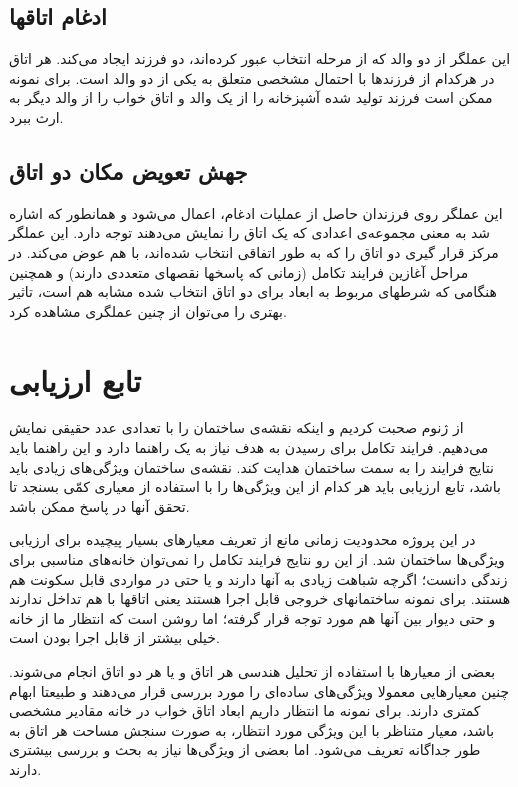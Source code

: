 \documentclass{report}
\begin{document}
\subsection{ادغام اتاقها}
این عملگر از دو والد که از مرحله انتخاب عبور کرده‌اند، دو فرزند ایجاد می‌کند. هر اتاق در هرکدام از فرزندها با احتمال مشخصی متعلق به یکی از دو والد است. برای نمونه ممکن است فرزند تولید شده آشپزخانه را از یک والد و اتاق خواب را از والد دیگر به ارث ببرد.

\subsection{جهش تعویض مکان دو اتاق}
این عملگر روی فرزندان حاصل از عملیات ادغام، اعمال می‌شود و همانطور که اشاره شد به معنی مجموعه‌ی اعدادی که یک اتاق را نمایش می‌دهند توجه دارد. این عملگر مرکز قرار گیری دو اتاق را که به طور اتفاقی انتخاب شده‌اند، با هم عوض می‌کند. در مراحل آغازین فرایند تکامل (زمانی که پاسخها نقصهای متعددی دارند) و همچنین هنگامی که شرطهای مربوط به ابعاد برای دو اتاق انتخاب شده مشابه هم است، تاثیر بهتری را می‌توان از چنین عملگری مشاهده کرد. 

\section{تابع ارزیابی}
از ژنوم صحبت کردیم و اینکه نقشه‌ی ساختمان را با تعدادی عدد حقیقی نمایش می‌دهیم. فرایند تکامل برای رسیدن به هدف نیاز به یک راهنما دارد و این راهنما باید نتایج فرایند را به سمت ساختمان هدایت کند. نقشه‌ی ساختمان ویژگی‌های زیادی باید باشد، تابع ارزیابی باید هر کدام از این ویژگی‌ها را با استفاده از معیاری کمّی بسنجد تا تحقق آنها در پاسخ ممکن باشد.

در این پروژه محدودیت زمانی مانع از تعریف معیارهای بسیار پیچیده برای ارزیابی ویژگی‌ها ساختمان شد. از این رو نتایج فرایند تکامل را نمی‌توان خانه‌های مناسبی برای زندگی دانست؛ اگرچه شباهت زیادی به آنها دارند و یا حتی در مواردی قابل سکونت هم هستند. برای نمونه ساختمانهای خروجی قابل اجرا هستند یعنی اتاقها با هم تداخل ندارند و حتی دیوار بین آنها هم مورد توجه قرار گرفته؛ اما روشن است که انتظار ما از خانه خیلی بیشتر از قابل اجرا بودن است.

بعضی از معیارها با استفاده از تحلیل هندسی هر اتاق و یا هر دو اتاق انجام می‌شوند. چنین معیارهایی معمولا ویژگی‌های ساده‌ای را مورد بررسی قرار می‌دهند و طبیعتا ابهام کمتری دارند. برای نمونه ما انتظار داریم ابعاد اتاق خواب در خانه مقادیر مشخصی باشد، معیار متناظر با این ويژگی مورد انتظار، به صورت سنجش مساحت هر اتاق به طور جداگانه تعریف می‌شود. اما بعضی از ویژگی‌ها نیاز به بحث و بررسی بیشتری دارند.
\end{document}
